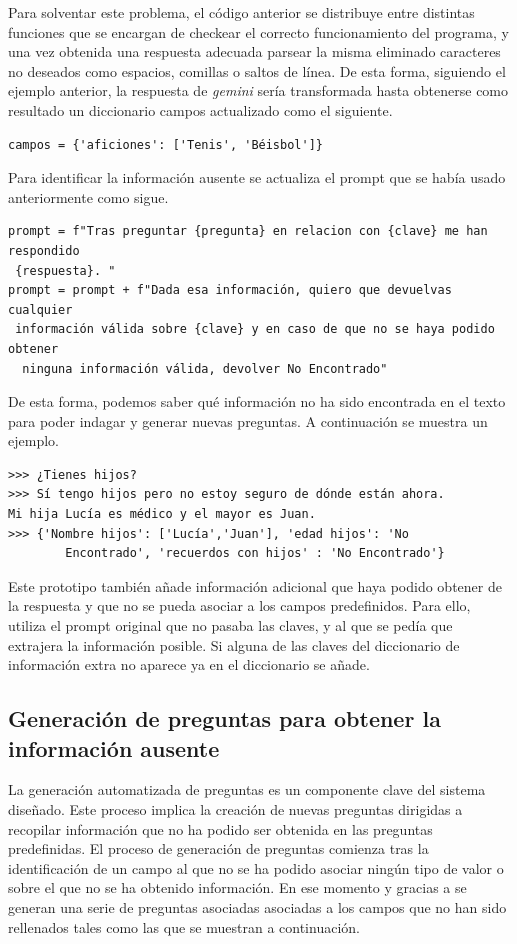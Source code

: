 Para solventar este problema, el código anterior se distribuye entre distintas funciones que se encargan de checkear el correcto funcionamiento del programa, y una vez obtenida una respuesta adecuada parsear la misma eliminado caracteres no deseados como espacios, comillas o saltos de línea. De esta forma, siguiendo el ejemplo anterior, la respuesta de \textit{gemini} sería transformada hasta obtenerse como resultado un diccionario campos actualizado como el siguiente.  
\begin{verbatim}
campos = {'aficiones': ['Tenis', 'Béisbol']}
\end{verbatim}

Para identificar la información ausente se actualiza el prompt que se había usado anteriormente como sigue.  

\begin{verbatim}
prompt = f"Tras preguntar {pregunta} en relacion con {clave} me han respondido
 {respuesta}. "
prompt = prompt + f"Dada esa información, quiero que devuelvas cualquier
 información válida sobre {clave} y en caso de que no se haya podido obtener
  ninguna información válida, devolver No Encontrado"
\end{verbatim}
De esta forma, podemos saber qué información no ha sido encontrada en el texto para poder indagar y generar nuevas preguntas. A continuación se muestra un ejemplo.
\begin{verbatim}
>>>	¿Tienes hijos?
>>> Sí tengo hijos pero no estoy seguro de dónde están ahora.
Mi hija Lucía es médico y el mayor es Juan.
>>> {'Nombre hijos': ['Lucía','Juan'], 'edad hijos': 'No
		Encontrado', 'recuerdos con hijos' : 'No Encontrado'}
\end{verbatim}

Este prototipo también añade información adicional que haya podido obtener de la respuesta y que no se pueda asociar a los campos predefinidos. Para ello, utiliza el prompt original que no pasaba las claves, y al que se pedía que extrajera la información posible. Si alguna de las claves del diccionario de información extra no aparece ya en el diccionario se añade. 

\subsection{Generación de preguntas para obtener la información ausente}
La generación automatizada de preguntas es un componente clave del sistema diseñado. Este proceso implica la creación de nuevas preguntas dirigidas a recopilar información que no ha podido ser obtenida en las preguntas predefinidas. El proceso de generación de preguntas comienza tras la identificación de un campo al que no se ha podido asociar ningún tipo de valor o sobre el que no se ha obtenido información. En ese momento y gracias a  se generan una serie de preguntas asociadas asociadas a los campos que no han sido rellenados tales como las que se muestran a continuación.  

